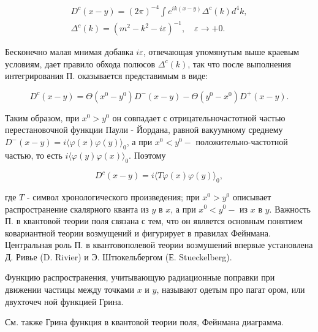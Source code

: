 \documentclass[10pt]{article}
\begin{document}
\[

\begin{gathered}

D^{c}(x-y)=(2 \pi)^{-4} \int e^{i k(x-y)} \Delta^{c}(k) d^{4} k, \\

\Delta^{c}(k)=\left(m^{2}-k^{2}-i \varepsilon\right)^{-1}, \quad \varepsilon \rightarrow+0 .

\end{gathered}

\]



Бесконечно малая мнимая добавка $i \varepsilon$, отвечающая упомянутым выше краевым условиям, дает правило обхода полюсов $\Delta^{c}(k)$, так что после выполнения интегрирования П. оказывается представимым в виде:



\[

D^{c}(x-y)=\Theta\left(x^{0}-y^{0}\right) D^{-}(x-y)-\Theta\left(y^{0}-x^{0}\right) D^{+}(x-y) .

\]



Таким образом, при $x^{0}>y^{0}$ он совпадает с отрицательночастотной частью перестановочной функции Паули - Йордана, равной вакуумному среднему $D^{-}(x-y)=i\langle\varphi(x) \varphi(y)\rangle_{0}$, а при $x^{0}<y^{0}-$ положительно-частотной частью, то есть $i\langle\varphi(y) \varphi(x)\rangle_{0}$. Поэтому



\[

D^{c}(x-y)=i\langle T \varphi(x) \varphi(y)\rangle_{0},

\]



где $T$ - символ хронологического произведения; при $x^{0}>y^{0}$ описывает распространение скалярного кванта из $y$ в $x$, а при $x^{0}<y^{0}-$ из $x$ в $y$. Важность П. в квантовой теории поля связана с тем, что он является основным понятием ковариантной теории возмущений и фигурирует в правилах Фейнмана. Центральная роль П. в квантовополевой теории возмушений впервые установлена Д. Ривье (D. Rivier) и Э. Штюкельбергом (Е. Stueckelberg).



Функцию распространения, учитывающую радиационные поправки при движении частицы между точками $x$ и $y$, называют одетым про пагат ором, или двухточеч ной функцией Грина.



См. также Грина функция в квантовой теории поля, Фейнмана диаграмма.
\end{document}
